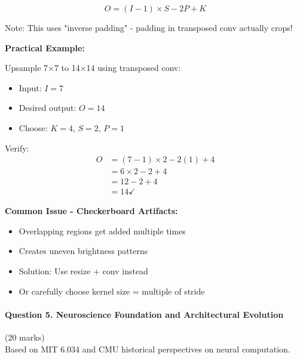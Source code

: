 \documentclass[12pt]{article}
\newcommand{\explanation}[1]{{\color{explanationcolor}#1}}
\begin{document}
\begin{enumerate}[(a)]
{{    \[\boxed{O = (I - 1) \times S - 2P + K}\]
    
    Note: This uses "inverse padding" - padding in transposed conv actually crops!
    }
    
    \textbf{Practical Example:}
    
    \explanation{
    Upsample 7×7 to 14×14 using transposed conv:
    \begin{itemize}
        \item Input: $I = 7$
        \item Desired output: $O = 14$
        \item Choose: $K = 4$, $S = 2$, $P = 1$
    \end{itemize}
    
    Verify:
    \begin{align}
    O &= (7 - 1) \times 2 - 2(1) + 4\\
    &= 6 \times 2 - 2 + 4\\
    &= 12 - 2 + 4\\
    &= 14 \checkmark
    \end{align}
    
    \textbf{Common Issue - Checkerboard Artifacts:}
    \begin{itemize}
        \item Overlapping regions get added multiple times
        \item Creates uneven brightness patterns
        \item Solution: Use resize + conv instead
        \item Or carefully choose kernel size = multiple of stride
    \end{itemize}
    }
    }
\end{enumerate}

\newpage
\paragraph{Question 5. Neuroscience Foundation and Architectural Evolution}{{\hfill (20 marks)}}\\
Based on MIT 6.034 and CMU historical perspectives on neural computation.
\end{document}
